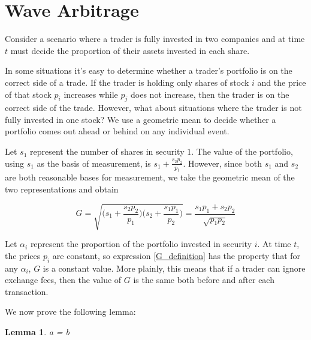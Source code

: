 \documentclass{article}
\newtheorem{lemma}{Lemma}
\begin{document}
\section{Wave Arbitrage}
Consider a scenario where a trader is fully invested in two companies and at
time $t$ must decide the proportion of their assets invested in each share.

In some situations it’s easy to determine whether a trader’s portfolio is on
the correct side of a trade. If the trader is holding only shares of stock $i$
and the price of that stock $p_i$ increases while $p_j$ does not increase,
then the trader is on the correct side of the trade. However, what about
situations where the trader is not fully invested in one stock? We use a
geometric mean to decide whether a portfolio comes out ahead or behind on any
individual event.

Let $s_1$ represent the number of shares in security $1$. The value of the
portfolio, using $s_1$ as the basis of measurement, is
$s_1 + \frac{s_2 p_2}{p_1}$. However, since both $s_1$ and $s_2$ are both
reasonable bases for measurement, we take the geometric mean of the two
representations and obtain

\begin{equation}
\label{G_definition}
  G = \sqrt{ \bigg( s_1 + \frac{s_2 p_2}{p_1} \bigg)
             \bigg( s_2 + \frac{s_1 p_1}{p_2} \bigg)
           }
    = \frac{s_1 p_1 + s_2 p_2}{\sqrt{p_1 p_2}}
\end{equation}

Let $\alpha_i$ represent the proportion of the portfolio invested in security
$i$. At time $t$, the prices $p_i$ are constant, so expression
\ref{G_definition} has the property that for any $\alpha_i$, $G$ is a constant
value. More plainly, this means that if a trader can ignore exchange fees, then
the value of $G$ is the same both before and after each transaction.

We now prove the following lemma:

\begin{lemma}
\label{lemma_1}
a = b
\end{lemma}



\end{document}
